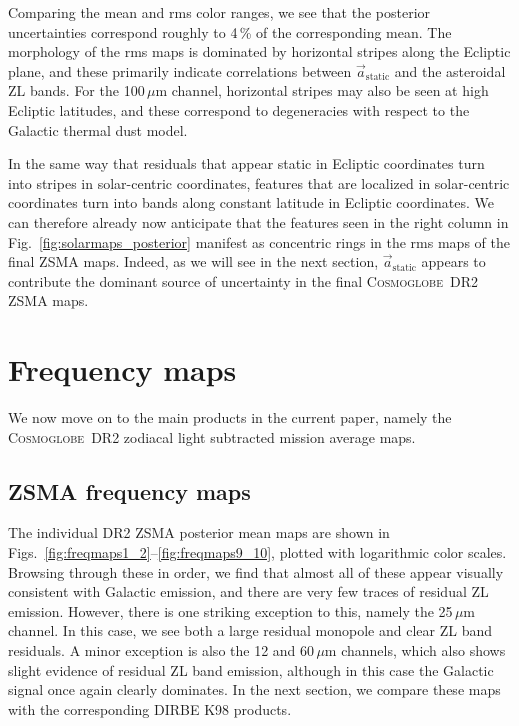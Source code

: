 \documentclass{aa}
\renewcommand{\a}[0]{\vec{a}}
\newcommand{\cosmoglobe}{\textsc{Cosmoglobe}}
\begin{document}
Comparing the mean and rms color ranges, we see that the posterior
uncertainties correspond roughly to 4\,\% of the corresponding mean.
The morphology of the rms maps is dominated by horizontal stripes
along the Ecliptic plane, and these primarily indicate correlations
between $\a_{\mathrm{static}}$ and the asteroidal ZL bands. For the
100$\,\mu$m channel, horizontal stripes may also be seen at high
Ecliptic latitudes, and these correspond to degeneracies with respect
to the Galactic thermal dust model.

In the same way that residuals that appear static in Ecliptic
coordinates turn into stripes in solar-centric coordinates, features
that are localized in solar-centric coordinates turn into bands along
constant latitude in Ecliptic coordinates. We can therefore already
now anticipate that the features seen in the right column in
Fig.~\ref{fig:solarmaps_posterior} manifest as concentric rings in the
rms maps of the final ZSMA maps. Indeed, as we will see in the next
section, $\a_{\mathrm{static}}$ appears to contribute the dominant
source of uncertainty in the final \cosmoglobe\ DR2 ZSMA maps.

\section{Frequency maps}
\label{sec:maps}

We now move on to the main products in the current paper, namely the
\cosmoglobe\ DR2 zodiacal light subtracted mission average maps.

\subsection{ZSMA frequency maps}

The individual DR2 ZSMA posterior mean maps are shown in
Figs.~\ref{fig:freqmaps1_2}--\ref{fig:freqmaps9_10}, plotted with
logarithmic color scales. Browsing through these in order, we find
that almost all of these appear visually consistent with Galactic
emission, and there are very few traces of residual ZL
emission. However, there is one striking exception to this, namely the
25$\,\mu$m channel. In this case, we see both a large residual
monopole and clear ZL band residuals. A minor exception is also the
12 and 60$\,\mu$m channels, which also shows slight evidence of residual ZL
band emission, although in this case the Galactic signal once again
clearly dominates. In the next section, we compare these maps with the
corresponding DIRBE K98 products.
\end{document}
